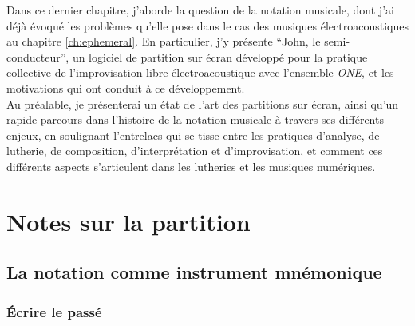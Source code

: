 \vspace*{\fill}

\noindent Dans ce dernier chapitre, j'aborde la question de la notation musicale, dont j'ai déjà évoqué les problèmes qu'elle pose dans le cas des musiques électroacoustiques au chapitre \ref{ch:ephemeral}. En particulier, j'y présente ``John, le semi-conducteur'', un logiciel de partition sur écran développé pour la pratique collective de l'improvisation libre électroacoustique avec l'ensemble \textit{ONE}, et les motivations qui ont conduit à ce développement.\\
\indent Au préalable, je présenterai un état de l'art des partitions sur écran, ainsi qu'un rapide parcours dans l'histoire de la notation musicale à travers ses différents enjeux, en soulignant l'entrelacs qui se tisse entre les pratiques d'analyse, de lutherie, de composition, d'interprétation et d'improvisation, et comment ces différents aspects s'articulent dans les lutheries et les musiques numériques.

\clearpage

\section{Notes sur la partition}

\subsection{La notation comme instrument mnémonique}

\subsubsection{Écrire le passé}

